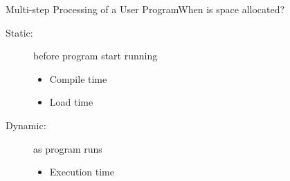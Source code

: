 \begin{frame}{Multi-step Processing of a User Program}{When is space
    allocated?}
  \begin{minipage}{.4\textwidth}
    \begin{center}
    \end{center}
    \label{reg}
  \end{minipage}
  \begin{minipage}{.55\textwidth}
    \begin{small}
      \begin{description}
      \item[Static:] before program start running
        \begin{itemize}
        \item Compile time
        \item Load time
        \end{itemize}
      \item[Dynamic:] as program runs
        \begin{itemize}
        \item Execution time
        \end{itemize}
      \end{description}
    \end{small}
  \end{minipage}
\end{frame}

